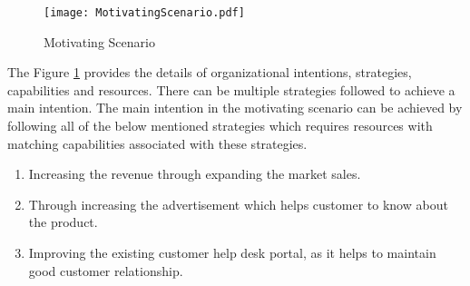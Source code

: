   \begin{figure}
  	\centering
  	\texttt{[image: MotivatingScenario.pdf]}
  	\caption{Motivating Scenario}
  	\label{fig:motivatingscenario}
  \end{figure}
  
The Figure \ref{fig:motivatingscenario} provides the details of organizational intentions, strategies, capabilities and resources. There can be multiple strategies followed to achieve a main intention. The main intention in the motivating scenario can be achieved by following all of the below mentioned strategies which requires resources with matching capabilities associated with these strategies. 
 
 \begin{enumerate}
 	\item Increasing the revenue through expanding the market sales. 
 	\item Through increasing the advertisement which helps customer to know about the product.
 	\item Improving the existing customer help desk portal, as it helps to maintain good customer relationship.
 \end{enumerate}
 
